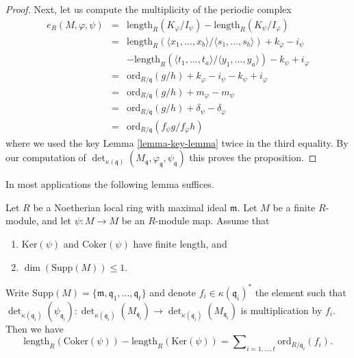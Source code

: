 \begin{proof}
\medskip\noindent
Next, let us compute the multiplicity of the periodic complex
\begin{eqnarray*}
e_R(M, \varphi, \psi) & = &
\text{length}_R(K_\varphi/I_\psi) - \text{length}_R(K_\psi/I_\varphi) \\
& = &
\text{length}_R(
\langle x_1, \ldots, x_b\rangle/
\langle s_1, \ldots, s_b\rangle)
+ k_\varphi - i_\psi \\
& & -
\text{length}_R(
\langle t_1, \ldots, t_a\rangle/
\langle y_1, \ldots, y_a\rangle)
- k_\psi + i_\varphi \\
& = &
\text{ord}_{R/\mathfrak q}(g/h) + k_\varphi - i_\psi - k_\psi + i_\varphi \\
& = &
\text{ord}_{R/\mathfrak q}(g/h) + m_\varphi - m_\psi \\
& = &
\text{ord}_{R/\mathfrak q}(g/h) + \delta_\psi - \delta_\varphi \\
& = &
\text{ord}_{R/\mathfrak q}(f_\psi g/f_\varphi h)
\end{eqnarray*}
where we used the key Lemma \ref{lemma-key-lemma} twice in the third equality.
By our computation of $\det_{\kappa(\mathfrak q)}
(M_{\mathfrak q}, \varphi_{\mathfrak q}, \psi_{\mathfrak q})$
this proves the proposition.
\end{proof}

\noindent
In most applications the following lemma suffices.

\begin{lemma}
\label{lemma-application-herbrand-quotient}
Let $R$ be a Noetherian local ring with maximal ideal $\mathfrak m$.
Let $M$ be a finite $R$-module, and let $\psi : M \to M$ be an
$R$-module map. Assume that
\begin{enumerate}
\item $\text{Ker}(\psi)$ and $\text{Coker}(\psi)$ have finite length, and
\item $\dim(\text{Supp}(M)) \leq 1$.
\end{enumerate}
Write
$\text{Supp}(M) = \{\mathfrak m, \mathfrak q_1, \ldots, \mathfrak q_t\}$
and denote $f_i \in \kappa(\mathfrak q_i)^*$ the element such that
$\det_{\kappa(\mathfrak q_i)}(\psi_{\mathfrak q_i}) :
\det_{\kappa(\mathfrak q_i)}(M_{\mathfrak q_i})
\to \det_{\kappa(\mathfrak q_i)}(M_{\mathfrak q_i})$
is multiplication by $f_i$. Then
we have
$$
\text{length}_R(\text{Coker}(\psi))
-
\text{length}_R(\text{Ker}(\psi))
=
\sum\nolimits_{i = 1, \ldots, t}
\text{ord}_{R/\mathfrak q_i}(f_i).
$$
\end{lemma}

